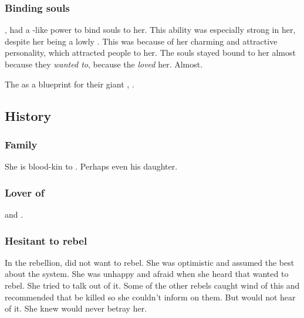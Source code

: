 \subsubsection{Binding souls}
, \Eryal{} had a \sephirah-like power to bind souls to her. 
This ability was especially strong in her, despite her being a lowly \thelyad. 
This was because of her charming and attractive personality, which attracted people to her. 
The souls stayed bound to her almost because they \emph{wanted to}, because the \emph{loved} her. 
Almost. 

The  as a blueprint for their giant \carcer, \iquin. 









\subsection{History}





\subsubsection{Family}
She is blood-kin to . 
Perhaps even his daughter. 





\subsubsection{Lover of \Shiaraid}
\Shiaraid{} and \Aryal{} . 





\subsubsection{Hesitant to rebel}
In the \Merkyran{} rebellion, \Eryal{} did not want to rebel.
She was optimistic and assumed the best about the \Merkyran{} system. 
She was unhappy and afraid when she heard that \Shiaraid{} wanted to rebel. 
She tried to talk \Shiaraid{} out of it. 
Some of the other rebels caught wind of this and recommended that \Eryal{} be killed so she couldn't inform on them. 
But \Shiaraid{} would not hear of it. 
She knew \Eryal{} would never betray her. 

